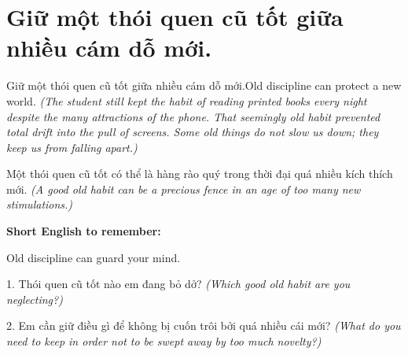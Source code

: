 \section{Giữ một thói quen cũ tốt giữa nhiều cám dỗ mới.}
\begin{truyen}{Giữ một thói quen cũ tốt giữa nhiều cám dỗ mới.}{Old discipline can protect a new world.}
\textit{(The student still kept the habit of reading printed books every night despite the many attractions of the phone. That seemingly old habit prevented total drift into the pull of screens. Some old things do not slow us down; they keep us from falling apart.)}
\end{truyen}
\begin{baihoc}
Một thói quen cũ tốt có thể là hàng rào quý trong thời đại quá nhiều kích thích mới.
\textit{(A good old habit can be a precious fence in an age of too many new stimulations.)}
\end{baihoc}
\begin{ghinhoanh}
\textbf{Short English to remember:}

Old discipline can guard your mind.
\end{ghinhoanh}
\begin{tuhocnhanh}
1. Thói quen cũ tốt nào em đang bỏ dở? \textit{(Which good old habit are you neglecting?)}

2. Em cần giữ điều gì để không bị cuốn trôi bởi quá nhiều cái mới? \textit{(What do you need to keep in order not to be swept away by too much novelty?)}
\end{tuhocnhanh}
\ngancach

